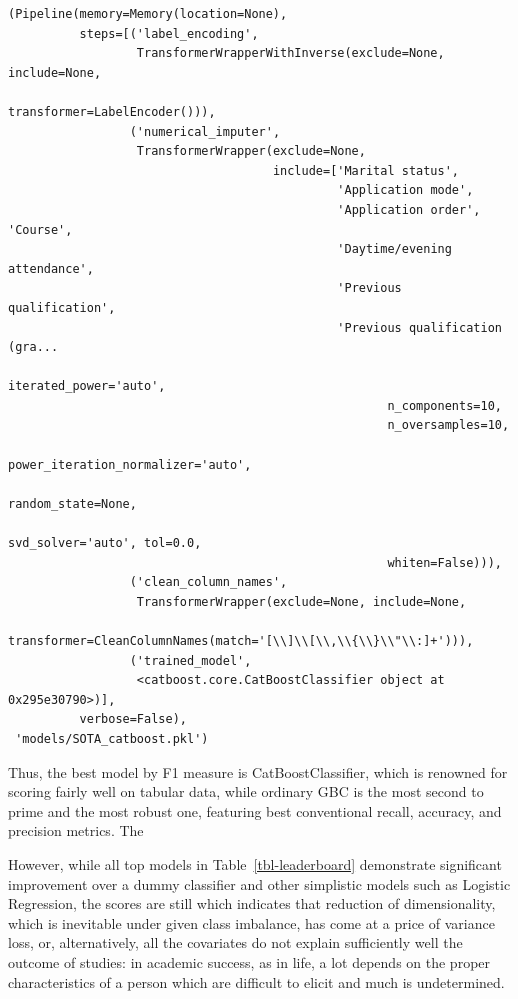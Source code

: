 \documentclass[
  letterpaper,
  DIV=11,
  numbers=noendperiod]{scrartcl}
\begin{document}
\begin{verbatim}
(Pipeline(memory=Memory(location=None),
          steps=[('label_encoding',
                  TransformerWrapperWithInverse(exclude=None, include=None,
                                                transformer=LabelEncoder())),
                 ('numerical_imputer',
                  TransformerWrapper(exclude=None,
                                     include=['Marital status',
                                              'Application mode',
                                              'Application order', 'Course',
                                              'Daytime/evening attendance',
                                              'Previous qualification',
                                              'Previous qualification (gra...
                                                     iterated_power='auto',
                                                     n_components=10,
                                                     n_oversamples=10,
                                                     power_iteration_normalizer='auto',
                                                     random_state=None,
                                                     svd_solver='auto', tol=0.0,
                                                     whiten=False))),
                 ('clean_column_names',
                  TransformerWrapper(exclude=None, include=None,
                                     transformer=CleanColumnNames(match='[\\]\\[\\,\\{\\}\\"\\:]+'))),
                 ('trained_model',
                  <catboost.core.CatBoostClassifier object at 0x295e30790>)],
          verbose=False),
 'models/SOTA_catboost.pkl')
\end{verbatim}

Thus, the best model by F1 measure is CatBoostClassifier, which is
renowned for scoring fairly well on tabular data, while ordinary GBC is
the most second to prime and the most robust one, featuring best
conventional recall, accuracy, and precision metrics. The

However, while all top models in Table~\ref{tbl-leaderboard} demonstrate
significant improvement over a dummy classifier and other simplistic
models such as Logistic Regression, the scores are still which indicates
that reduction of dimensionality, which is inevitable under given class
imbalance, has come at a price of variance loss, or, alternatively, all
the covariates do not explain sufficiently well the outcome of studies:
in academic success, as in life, a lot depends on the proper
characteristics of a person which are difficult to elicit and much is
undetermined.
\end{document}
